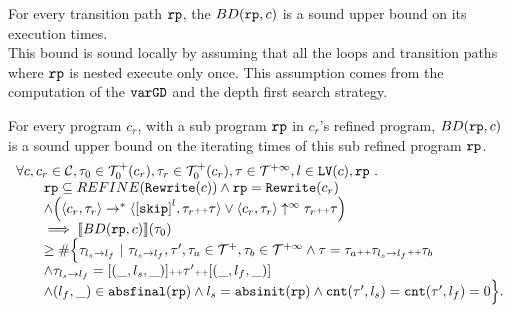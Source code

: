 For every transition path $\mathtt{rp}$, the $BD(\mathtt{rp}, c)$
is a sound upper bound on its execution times.
\\
This bound is sound locally by assuming
that all the loops and transition paths where $\mathtt{rp}$ is nested execute only once.
This assumption comes from the computation of the $\mathtt{varGD}$ and the depth first search strategy.
\\
%
\begin{lemma}
    For every program $c_r$, with a sub program $\mathtt{rp}$ in $c_r$'s refined program,
    $BD(\mathtt{rp}, c)$ is a sound upper bound on the iterating times of this sub refined program $\mathtt{rp}$.
    \[
      \begin{array}{l}
      \forall c, c_r \in \cdom, \trace_0 \in \ftdom_0(c_r), \trace_r \in \ftdom_0(c_r), \trace \in \tdom, l \in \lvar(c), \rprog \sthat 
      \\ \qquad
      \rprog \subseteq REFINE(\algrewrite(c))
      \land 
      \rprog = \algrewrite(c_r)
      \\ \qquad
      \land 
      \Big(
        \config{c_r, \trace_r} \rightarrow^* \config{\clabel{\eskip}^{l}, \trace_r \tracecat \trace}
        \lor \config{c_r, \trace_r} \uparrow^{\infty} \trace_r \tracecat \trace 
        \Big)
      \\ \qquad
      \implies
      \econfig{BD(\rprog, c)}(\trace_0) 
      \\ \qquad \geq 
      \# \Big\{\trace_{l_s \to l_f} ~\vert~ \trace_{l_s \to l_f}, \trace', \trace_a \in \ftdom, \trace_b \in \tdom
      \land \trace = \trace_a \tracecat \trace_{l_s \to l_f} \tracecat \trace_b
      \\ \qquad
      \land \trace_{l_s \to l_f} = [(\_, l_s, \_)] \tracecat \trace' \tracecat [(\_, l_f, \_)]
      \\ \qquad
      \land (l_{f}, \_) \in \absfinal(\rprog)
      \land l_s = \absinit(\rprog)
      \land \counter(\trace', l_s) = \counter(\trace', l_f) = 0 
      \Big\}.
      \end{array}
    \]
    \end{lemma}

